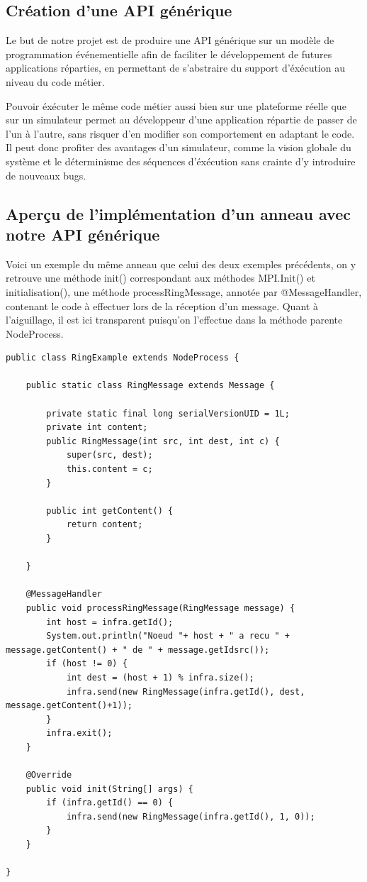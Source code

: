 \documentclass{article}
\begin{document}
		
			\subsection{Création d'une API générique}
				Le but de notre projet est de produire une API générique sur un modèle de programmation événementielle afin de faciliter le développement de futures applications réparties, en permettant de s'abstraire du support d'éxécution au niveau du code métier. \par
Pouvoir éxécuter le même code métier aussi bien sur une plateforme réelle que sur un simulateur permet au développeur d'une application répartie de passer de l'un à l'autre, sans risquer d'en  modifier son comportement en adaptant le code. \newline Il peut donc profiter des avantages d'un simulateur, comme la vision globale du système et le déterminisme des séquences d'éxécution  sans crainte d'y introduire de nouveaux bugs. \par
 
			\newpage
			\subsection{Aperçu de l'implémentation d'un anneau avec notre API générique}
				Voici un exemple du même anneau que celui des deux exemples précédents, on y retrouve une méthode init() correspondant aux méthodes MPI.Init() et initialisation(),
une méthode processRingMessage, annotée par @MessageHandler, contenant le code à effectuer lors de la réception d'un message. Quant à l'aiguillage, il est ici transparent puisqu'on l'effectue dans la méthode parente NodeProcess.
				\begin{lstlisting}
public class RingExample extends NodeProcess {

	public static class RingMessage extends Message {
	
		private static final long serialVersionUID = 1L;
		private int content;
		public RingMessage(int src, int dest, int c) {
			super(src, dest);
			this.content = c;
		}

		public int getContent() {
			return content;
		}

	}

	@MessageHandler
	public void processRingMessage(RingMessage message) {
		int host = infra.getId();
		System.out.println("Noeud "+ host + " a recu " + message.getContent() + " de " + message.getIdsrc());
		if (host != 0) {
			int dest = (host + 1) % infra.size();
			infra.send(new RingMessage(infra.getId(), dest, message.getContent()+1));
		}
		infra.exit();
	}

	@Override
	public void init(String[] args) {
		if (infra.getId() == 0) {
			infra.send(new RingMessage(infra.getId(), 1, 0));
		}
	}

}			
				\end{lstlisting}
\end{document}
